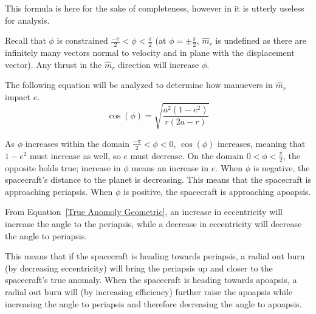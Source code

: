 \documentclass[../basicOrbitalDynamics.tex]{subfiles}
\begin{document}
This formula is here for the sake of completeness, however in it is utterly useless for analysis.

Recall that $\phi$ is constrained $\frac{-\pi}{2}<\phi<\frac{\pi}{2}$ (at $\phi=\pm\frac{\pi}{2}$, $\hat{m}_r$ is undefined as there are infinitely many vectors normal to velocity and in plane with the displacement vector). Any thrust in the $\hat{m}_r$ direction will increase $\phi$.

The following equation will be analyzed to determine how manuevers in $\hat{m}_r$ impact $e$.
\[\cos(\phi)=\sqrt{\frac{a^2(1-e^2)}{r(2a-r)}}\]

As $\phi$ increases within the domain $\frac{-\pi}{2}<\phi<0$, $\cos(\phi)$ increases, meaning that $1-e^2$ must increase as well, so $e$ must decrease. On the domain $0<\phi<\frac{\pi}{2}$, the opposite holds true; increase in $\phi$ means an increase in $e$. When $\phi$ is negative, the spacecraft's distance to the planet is decreasing. This means that the spacecraft is approaching periapsis. When $\phi$ is positive, the spacecraft is approaching apoapsis.

From Equation~\eqref{True Anomoly Geometric}, an increase in eccentricity will increase the angle to the periapsis, while a decrease in eccentricity will decrease the angle to periapsis.

This means that if the spacecraft is heading towards periapsis, a radial out burn (by decreasing eccentricity) will bring the periapsis up and closer to the spacecraft's true anomaly. When the spacecraft is heading towards apoapsis, a radial out burn will (by increasing efficiency) further raise the apoapsis while increasing the angle to periapsis and therefore decreasing the angle to apoapsis.
\begin{comment}
\begin{figure}[H]
    \centering
    \begin{tikzpicture}[>=latex]
        \def\SMA{2}
        \def\vO{7}
        \def\phiO{0}
        \def\X{\fpeval{-sqrt(3)}}
        \def\Y{1}
        \def\posR{\fpeval{sqrt((\X)^2+\Y^2)}}
        \fill(0,0) circle (2pt);
        \foreach \dV in {1,2,3,4,5,6,7,8,9,10}
        {
        \definecolor{orbCol}{gray}{\fpeval{1-\dV/20}}
        \def\ecc{\fpeval{sqrt(1-(cos(\dV/\vO))^2*(1-tan(\phiO)*tan(\dV/\vO))^2)}}
        \def\omeg{\fpeval{atan(\Y/\X)-acos((\SMA*(1-\ecc^2)-\posR)/(\ecc*\posR))}}
        \def\slr{\fpeval{\SMA*(1-\ecc^2)}}
        \draw[domain=0:2*pi,samples=300, orbCol] plot ({deg(\x+\omeg)-180}:{(\slr)/(1+\ecc*cos(\x r))});
        \fill[blue] (\X,\Y) circle (3pt);
        }
    \end{tikzpicture}
    \caption{A counterclockwise orbit with progressively-labeled burns in the $\hat{u}_r$ direction. The darker the orbit, the more $\Delta V$ has been expended. The beginning orbit is the near-circular one. The spacecraft is the blue point. If the spacecraft were instead orbiting clockwise, then the lighter shades would indicate more $\Delta V$ expenditure with the darker orbit being the original orbit}
\end{figure}
\end{comment}
\end{document}
